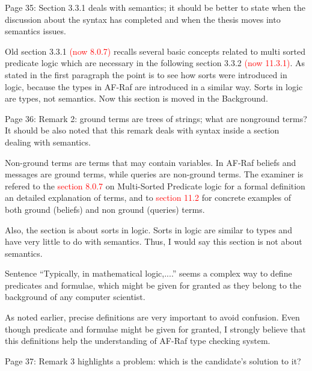 \documentclass{article}
\newcommand*\R[1]{\textcolor{red}{#1}} %
\newenvironment{them}{\noindent\begingroup\color{blue}}{\endgroup\par}
\begin{document}
\begin{them}

Page 35:
Section 3.3.1 deals with semantics; it should be better to state when the
discussion about the syntax has completed and when the thesis moves into
semantics issues.

\end{them}
Old section 3.3.1 \R{(now 8.0.7)} recalls several basic concepts related to
multi sorted predicate logic which are necessary in the following section 3.3.2
\R{(now 11.3.1)}. As stated in the first paragraph the point is to see how
sorts were introduced in logic, because the types in AF-Raf are introduced in a
similar way. Sorts in logic are types, not semantics. Now this section is moved
in the Background.

\begin{them}

Page 36:
Remark 2: ground terms are trees of strings; what are nonground terms? It
should be also noted that this remark deals with syntax inside a section
dealing with semantics.

\end{them}
Non-ground terms are terms that may contain variables. In AF-Raf beliefs and
messages are ground terms, while queries are non-ground terms. The examiner is
refered to the \R{section 8.0.7} on Multi-Sorted Predicate logic for a formal
definition an detailed explanation of terms, and to \R{section 11.2} for
concrete examples of both ground (beliefs) and non ground (queries) terms.

Also, the section is about sorts in logic. Sorts in logic are similar to types
and have very little to do with semantics. Thus, I would say this section is
not about semantics.

\begin{them}

Sentence ``Typically, in mathematical logic,....'' seems a complex way to define
predicates and formulae, which might be given for granted as they belong to the
background of any computer scientist.

\end{them}
As noted earlier, precise definitions are very important to avoid confusion.
Even though predicate and formulae might be given for granted, I strongly
believe that this definitions help the understanding of AF-Raf type checking
system.

\begin{them}

Page 37:
Remark 3 highlights a problem: which is the candidate's solution to it?

\end{them}
\end{document}
